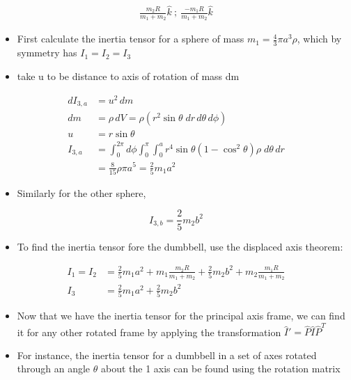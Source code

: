 \documentclass[a4paper,11pt,normalem]{article}
\begin{document}
\[
    \begin{aligned}
    \frac{m_2 R}{m_1 + m_2}\hat{k} ~;~ \frac{-m_1 R}{m_1 + m_2}\hat{k}
    \end{aligned}
\]

\begin{itemize}
\item
  First calculate the inertia tensor for a sphere of mass
  \(m_1 = \frac{4}{3}\pi a^3 \rho\), which by symmetry has
  \(I_1 = I_2 = I_3\)
\item
  take u to be distance to axis of rotation of mass dm
\end{itemize}

\[
    \begin{aligned}
    dI_{3,a} &= u^2\,dm \\
    dm &= \rho\,dV = \rho (r^2 \sin\theta \;dr\,d\theta\,d\phi) \\
    u &= r\sin\theta \\
    I_{3,a} &= \int_0^{2\pi} d\phi \int_0^\pi \int_0^a r^4\sin\theta (1 - \cos^2\theta) \rho\;d\theta\,dr \\
    &= \frac{8}{15}\rho \pi a^5 = \frac{2}{5}m_1 a^2
    \end{aligned}
\]

\begin{itemize}
\item
  Similarly for the other sphere,
\end{itemize}

\[
    I_{3, b} = \frac{2}{5}m_2 b^2
\]

\begin{itemize}
\item
  To find the inertia tensor fore the dumbbell, use the displaced axis
  theorem:
\end{itemize}

\[
    \begin{aligned}
    I_1 = I_2 &= \frac{2}{5}m_1 a^2 + m_1 \frac{m_2 R}{m_1 + m_2} + \frac{2}{5}m_2 b^2 + m_2 \frac{m_1 R}{m_1 + m_2} \\
    I_3 &= \frac{2}{5}m_1 a^2 + \frac{2}{5}m_2 b^2
    \end{aligned}
\]

\begin{itemize}
\item
  Now that we have the inertia tensor for the principal axis frame, we
  can find it for any other rotated frame by applying the transformation
  \(\hat{I}' = \hat{P}\hat{I}\hat{P}^T\)
\item
  For instance, the inertia tensor for a dumbbell in a set of axes
  rotated through an angle \(\theta\) about the 1 axis can be found
  using the rotation matrix
\end{itemize}
\end{document}
